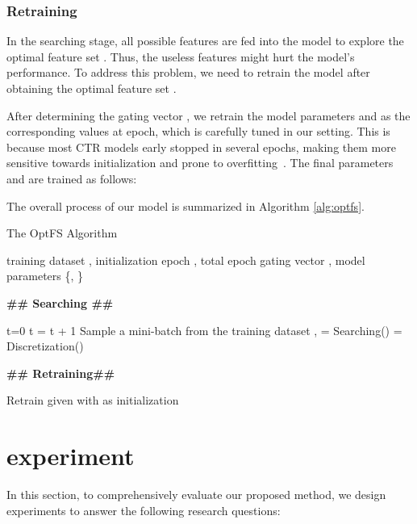 \documentclass[sigconf]{acmart}
\begin{document}
\subsubsection{Retraining}
\label{sec:method_lbc_retrain}
In the searching stage, all possible features are fed into the model to explore the optimal feature set . Thus, the useless features might hurt the model's performance. To address this problem, we need to retrain the model after obtaining the optimal feature set . 

After determining the gating vector , we retrain the model parameters  and  as the corresponding values at  epoch, which is carefully tuned in our setting. This is because most CTR models early stopped in several epochs, making them more sensitive towards initialization and prone to overfitting~\cite{CTR-Overfit}. The final parameters  and  are trained as follows:

The overall process of our model is summarized in Algorithm \ref{alg:optfs}.

\begin{algorithm}
	\caption{The OptFS Algorithm} 
    \label{alg:optfs}
	\begin{algorithmic}[1]
		\Require training dataset , initialization epoch , total epoch 
        \Ensure gating vector , model parameters \{, \}
        
        \State \textbf{\#\# Searching \#\#}
        
        \State t=0
            \State t = t + 1
                \State Sample a mini-batch from the training dataset
                \State,  = Searching() 
            \EndWhile
            \If{}
            \State 
            \EndIf
        \EndWhile 
        \State  = Discretization() 

        \State \textbf{\#\# Retraining\#\#}

        \State Retrain  given  with  as initialization  
	\end{algorithmic}
\end{algorithm}



 \section{experiment}
\label{sec:experiment}

In this section, to comprehensively evaluate our proposed method, we design experiments to answer the following research questions: 
\end{document}
